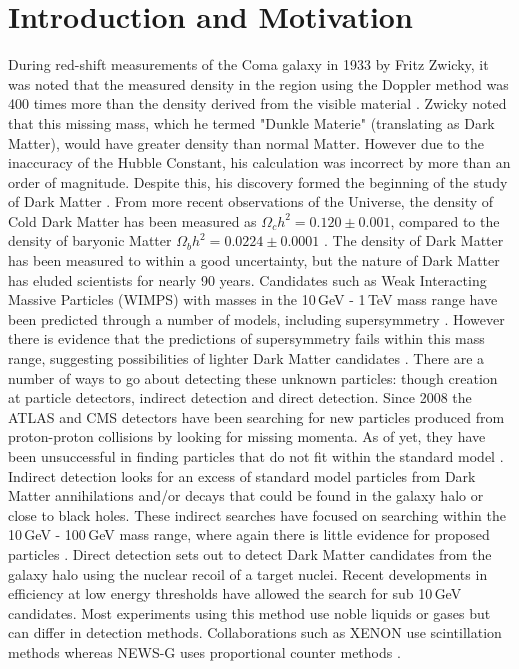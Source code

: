 \documentclass[a4paper]{article}
\begin{document}
\section{Introduction and Motivation}
During red-shift measurements of the Coma galaxy in 1933 by Fritz Zwicky, it was noted that the measured density in the region using the Doppler method was 400 times more than the density derived from the visible material \cite{andernach2017english}. Zwicky noted that this missing mass, which he termed "Dunkle Materie" (translating as Dark Matter), would have greater density than normal Matter. However due to the inaccuracy of the Hubble Constant, his calculation was incorrect by more than an order of magnitude. Despite this, his discovery formed the beginning of the study of Dark Matter \cite{richmond}. From more recent observations of the Universe, the density of Cold Dark Matter has been measured as $\Omega_ch^2 = 0.120 \pm  0.001 $, compared to the density of baryonic Matter $\Omega_bh^2 = 0.0224 \pm 0.0001 $ \cite{2020}.
\newline The density of Dark Matter has been measured to within a good uncertainty, but the nature of Dark Matter has eluded scientists for nearly 90 years. Candidates such as Weak Interacting Massive Particles (WIMPS) with  masses in the 10\,GeV - 1\,TeV mass range have been predicted through a number of models, including supersymmetry \cite{cern}. However there is evidence that the predictions of supersymmetry fails within this mass range, suggesting possibilities of lighter Dark Matter candidates \cite{Buchmueller:2012hv}.
\newline There are a number of ways to go about detecting these unknown particles: though creation at particle detectors, indirect detection and direct detection. Since 2008 the ATLAS and CMS detectors have been searching for new particles produced from proton-proton collisions by looking for missing momenta. As of yet, they have been unsuccessful in finding particles that do not fit within the standard model \cite{lopes_2020}. Indirect detection looks for an excess of standard model particles from Dark Matter annihilations and/or decays that could be found in the galaxy halo or close to black holes. These indirect searches have focused on searching within the 10\,GeV - 100\,GeV mass range, where again there is little evidence for proposed particles \cite{leane2020indirect}. Direct detection sets out to detect Dark Matter candidates from the galaxy halo using the nuclear recoil of a target nuclei. Recent developments in efficiency at low energy thresholds have allowed the search for sub 10\,GeV candidates. Most experiments using this method use noble liquids or gases but can differ in detection methods. Collaborations such as XENON use scintillation methods whereas NEWS-G uses proportional counter methods \cite{Aprile_2014,BROSSARD2019412}.
\end{document}
